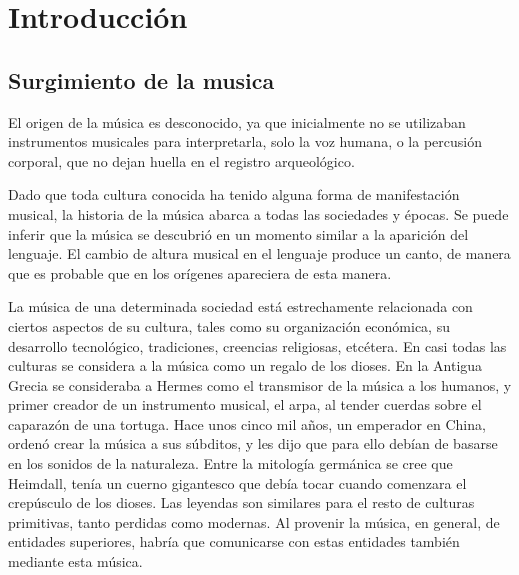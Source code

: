 
\chapter{Introducción}  %

\ifpdf
    \graphicspath{{Chapter1/Figs/Raster/}{Chapter1/Figs/PDF/}{Chapter1/Figs/}}
\else
    \graphicspath{{Chapter1/Figs/Vector/}{Chapter1/Figs/}}
\fi


\section{Surgimiento de la musica} %

El origen de la música es desconocido, ya que inicialmente no se utilizaban instrumentos
musicales para interpretarla, solo la voz humana, o la percusión corporal, que no dejan
huella en el registro arqueológico. 

Dado que toda cultura conocida ha tenido alguna forma de manifestación musical, la
historia de la música abarca a todas las sociedades y épocas. Se puede inferir que la
música se descubrió en un momento similar a la aparición del lenguaje. El cambio de altura
musical en el lenguaje produce un canto, de manera que es probable que en los orígenes
apareciera de esta manera.

La música de una determinada sociedad está estrechamente relacionada con ciertos aspectos
de su cultura, tales como su organización económica, su desarrollo tecnológico,
tradiciones, creencias religiosas, etcétera. En casi todas las culturas se considera a la
música como un regalo de los dioses. En la Antigua Grecia se consideraba a Hermes como el
transmisor de la música a los humanos, y primer creador de un instrumento musical, el
arpa, al tender cuerdas sobre el caparazón de una tortuga. Hace unos cinco mil años, un
emperador en China, ordenó crear la música a sus súbditos, y les dijo que para ello debían
de basarse en los sonidos de la naturaleza. Entre la mitología germánica se cree que
Heimdall, tenía un cuerno gigantesco que debía tocar cuando comenzara el crepúsculo de los
dioses. Las leyendas son similares para el resto de culturas primitivas, tanto perdidas
como modernas. Al provenir la música, en general, de entidades superiores, habría que
comunicarse con estas entidades también mediante esta música. 

